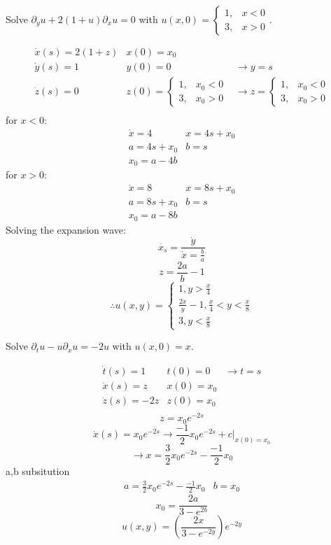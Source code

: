 \documentclass[12pt]{exam}
\newcommand{\px}{\partial_x}
\newcommand{\py}{\partial_y}
\newcommand{\pt}{\partial_t}
\begin{document}
\begin{questions}
\newpage 
\question Solve $\py u + 2(1+u)\px u = 0$ with $u(x,0) = \begin{cases}1, & x<0\\ 
3, & x>0\end{cases}$.
\begin{solutionorbox}[\stretch{1}]
$$
\begin{matrix}
  \Dot{x}(s) =2(1+z) & x(0) = x_0 &\\
  \Dot{y}(s) = 1 & y(0) = 0 &\rightarrow y = s \\
  \Dot{z}(s) = 0 & z(0) = \begin{cases}1, & x_0<0\\ 
    3, & x_0>0\end{cases} &\rightarrow z = \begin{cases}1, & x_0<0\\ 
      3, & x_0>0\end{cases}\\
\end{matrix}
$$
for $x<0$:
$$
\begin{matrix}
  \Dot{x} = 4 & x = 4s+x_0\\
  a = 4s+x_0 & b = s\\
  x_0 = a-4b
\end{matrix}
$$
for $x>0$:
$$
\begin{matrix}
  \Dot{x} = 8 & x = 8s+x_0\\
  a = 8s+x_0 & b = s\\
  x_0 = a-8b
\end{matrix}
$$
Solving the expansion wave:
\[\Dot{x_s} = \frac{\Dot{y}}{\Dot{x} = \frac{b}{a}}\]
\[z = \frac{2a}{b}-1\]
\[\therefore u(x,y) = \begin{cases} 1, y>\frac{x}{4}
\\ \frac{2x}{y}-1,\frac{x}{4}<y<\frac{x}{8}
\\3,y<\frac{x}{8}
\end{cases}\]
\end{solutionorbox}

\newpage 
\question Solve $\pt u - u\px u = - 2u$ with $u(x,0) = x$.
\begin{solutionorbox}[\stretch{1}]
$$
\begin{matrix}
  \Dot{t}(s) = 1 & t(0) = 0 & \rightarrow t = s \\
  \Dot{x}(s) = z & x(0) = x_0 &\\
  \Dot{z}(s) = -2z & z(0) = x_0 &\\
\end{matrix}
$$
\[z = x_0e^{-2s}\]
\[\Dot{x}(s) = x_0e^{-2s} \rightarrow \frac{-1}{2}x_0e^{-2s}+c|_{x(0) = x_0 }\]
\[\rightarrow x= \frac{3}{2}x_0e^{-2s} - \frac{-1}{2}x_0\]
a,b subsitution
$$
\begin{matrix}
  a = \frac{3}{2}x_0e^{-2s} - \frac{-1}{2}x_0 & b = x_0
\end{matrix}
$$
\[x_0 = \frac{2a}{3-e^{2b}}\]
\[u(x,y) = \left(\frac{2x}{3-e^{-2y}}\right)e^{-2y}\]
\end{solutionorbox}


\end{questions}
\end{document}
